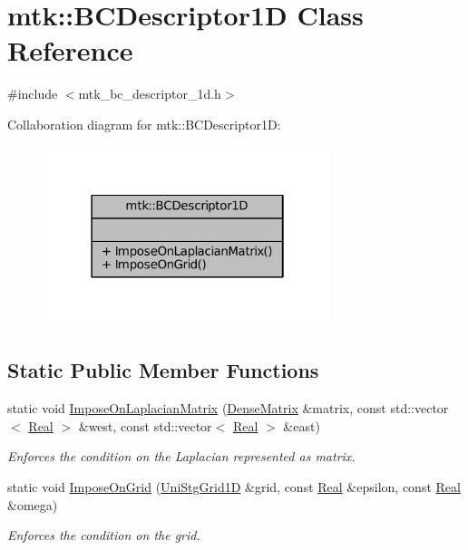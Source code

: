 \hypertarget{classmtk_1_1BCDescriptor1D}{\section{mtk\+:\+:B\+C\+Descriptor1\+D Class Reference}
\label{classmtk_1_1BCDescriptor1D}
}


{\ttfamily \#include $<$mtk\+\_\+bc\+\_\+descriptor\+\_\+1d.\+h$>$}



Collaboration diagram for mtk\+:\+:B\+C\+Descriptor1\+D\+:
\nopagebreak
\begin{figure}[H]
\begin{center}
\leavevmode
\includegraphics[width=238pt]{classmtk_1_1BCDescriptor1D__coll__graph}
\end{center}
\end{figure}
\subsection*{Static Public Member Functions}
\begin{DoxyCompactItemize}
\item 
static void \hyperlink{classmtk_1_1BCDescriptor1D_a33e51235eaa930e4470f027001a023cf}{Impose\+On\+Laplacian\+Matrix} (\hyperlink{classmtk_1_1DenseMatrix}{Dense\+Matrix} \&matrix, const std\+::vector$<$ \hyperlink{group__c01-roots_gac080bbbf5cbb5502c9f00405f894857d}{Real} $>$ \&west, const std\+::vector$<$ \hyperlink{group__c01-roots_gac080bbbf5cbb5502c9f00405f894857d}{Real} $>$ \&east)
\begin{DoxyCompactList}\small\item\em Enforces the condition on the Laplacian represented as matrix. \end{DoxyCompactList}\item 
static void \hyperlink{classmtk_1_1BCDescriptor1D_adfb101c1a12b452f83dacd207febea0a}{Impose\+On\+Grid} (\hyperlink{classmtk_1_1UniStgGrid1D}{Uni\+Stg\+Grid1\+D} \&grid, const \hyperlink{group__c01-roots_gac080bbbf5cbb5502c9f00405f894857d}{Real} \&epsilon, const \hyperlink{group__c01-roots_gac080bbbf5cbb5502c9f00405f894857d}{Real} \&omega)
\begin{DoxyCompactList}\small\item\em Enforces the condition on the grid. \end{DoxyCompactList}\end{DoxyCompactItemize}


